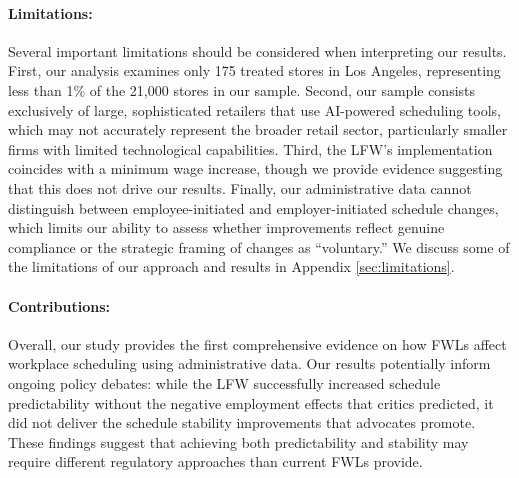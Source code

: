 \documentclass[letterpaper,11pt,leqno]{article}
\theoremstyle{paper}
\begin{document}
\paragraph{Limitations:} Several important limitations should be considered when interpreting our results. First, our analysis examines only 175 treated stores in Los Angeles, representing less than 1\% of the 21,000 stores in our sample. Second, our sample consists exclusively of large, sophisticated retailers that use AI-powered scheduling tools, which may not accurately represent the broader retail sector, particularly smaller firms with limited technological capabilities. Third, the LFW's implementation coincides with a minimum wage increase, though we provide evidence suggesting that this does not drive our results. Finally, our administrative data cannot distinguish between employee-initiated and employer-initiated schedule changes, which limits our ability to assess whether improvements reflect genuine compliance or the strategic framing of changes as ``voluntary.'' We discuss some of the limitations of our approach and results in Appendix \ref{sec:limitations}.

\paragraph{Contributions:}
Overall, our study provides the first comprehensive evidence on how FWLs affect workplace scheduling using administrative data. Our results potentially inform ongoing policy debates: while the LFW successfully increased schedule predictability without the negative employment effects that critics predicted, it did not deliver the schedule stability improvements that advocates promote. These findings suggest that achieving both predictability and stability may require different regulatory approaches than current FWLs provide.
\end{document}
